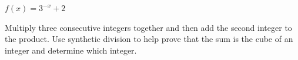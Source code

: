 \documentclass[fleqn,addpoints]{exam}
\begin{document}
\begin{questions}
\begin{parts}
      \end{parts}

    \question $f(x) = 3^{-x} + 2$


      \bonusquestion[10]
        Multiply three consecutive integers together and then add the second integer to the product.  Use synthetic
        division to help prove that the sum is the cube of an integer and determine which integer.


\end{questions}
\end{document}
